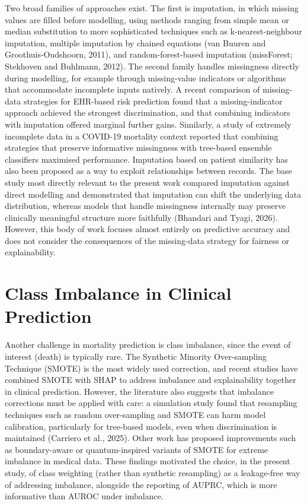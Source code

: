 \documentclass[12pt,a4paper]{report}
\begin{document}
Two broad families of approaches exist. The first is imputation, in which missing values are filled before modelling, using methods ranging from simple mean or median substitution to more sophisticated techniques such as k-nearest-neighbour imputation, multiple imputation by chained equations (van Buuren and Groothuis-Oudshoorn, 2011), and random-forest-based imputation (missForest; Stekhoven and Buhlmann, 2012). The second family handles missingness directly during modelling, for example through missing-value indicators or algorithms that accommodate incomplete inputs natively. A recent comparison of missing-data strategies for EHR-based risk prediction found that a missing-indicator approach achieved the strongest discrimination, and that combining indicators with imputation offered marginal further gains. Similarly, a study of extremely incomplete data in a COVID-19 mortality context reported that combining strategies that preserve informative missingness with tree-based ensemble classifiers maximised performance. Imputation based on patient similarity has also been proposed as a way to exploit relationships between records. The base study most directly relevant to the present work compared imputation against direct modelling and demonstrated that imputation can shift the underlying data distribution, whereas models that handle missingness internally may preserve clinically meaningful structure more faithfully (Bhandari and Tyagi, 2026). However, this body of work focuses almost entirely on predictive accuracy and does not consider the consequences of the missing-data strategy for fairness or explainability.


\section{Class Imbalance in Clinical Prediction}
Another challenge in mortality prediction is class imbalance, since the event of interest (death) is typically rare. The Synthetic Minority Over-sampling Technique (SMOTE) is the most widely used correction, and recent studies have combined SMOTE with SHAP to address imbalance and explainability together in clinical prediction. However, the literature also suggests that imbalance corrections must be applied with care: a simulation study found that resampling techniques such as random over-sampling and SMOTE can harm model calibration, particularly for tree-based models, even when discrimination is maintained (Carriero et al., 2025). Other work has proposed improvements such as boundary-aware or quantum-inspired variants of SMOTE for extreme imbalance in medical data. These findings motivated the choice, in the present study, of class weighting (rather than synthetic resampling) as a leakage-free way of addressing imbalance, alongside the reporting of AUPRC, which is more informative than AUROC under imbalance.
\end{document}
